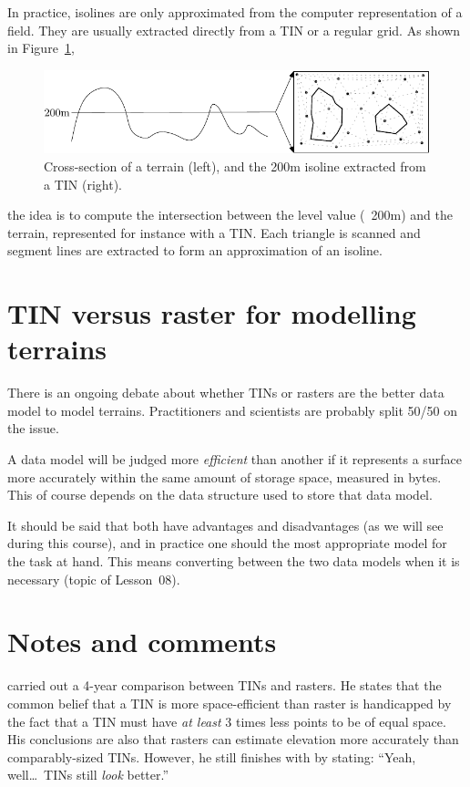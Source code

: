 In practice, isolines are only approximated from the computer representation of a field.
They are usually extracted directly from a TIN or a regular grid. 
As shown in Figure~\ref{fig:isoline},
\begin{figure}
  \centering
  \includegraphics[width=\textwidth]{figs/isoline}
  \caption{Cross-section of a terrain (left), and the 200m isoline extracted from a TIN (right).} 
\label{fig:isoline}
\end{figure}
the idea is to compute the intersection between the level value (\eg\ 200m) and the terrain, represented for instance with a TIN\@. 
Each triangle is scanned and segment lines are extracted to form an approximation of an isoline.


%
\section{TIN versus raster for modelling terrains}

There is an ongoing debate about whether TINs or rasters are the better data model to model terrains.
Practitioners and scientists are probably split 50/50 on the issue.

A data model will be judged more \emph{efficient} than another if it represents a surface more accurately within the same amount of storage space, measured in bytes.
This of course depends on the data structure used to store that data model.

It should be said that both have advantages and disadvantages (as we will see during this course), and in practice one should the most appropriate model for the task at hand.
This means converting between the two data models when it is necessary (topic of Lesson~08).


%
\section{Notes and comments}

\citet{Kumler94} carried out a 4-year comparison between TINs and rasters.
He states that the common belief that a TIN is more space-efficient than raster is handicapped by the fact that a TIN must have \emph{at least} 3 times less points to be of equal space.
His conclusions are also that rasters can estimate elevation more accurately than comparably-sized TINs.
However, he still finishes with by stating: ``Yeah, well\ldots\ TINs still \emph{look} better.'' 

